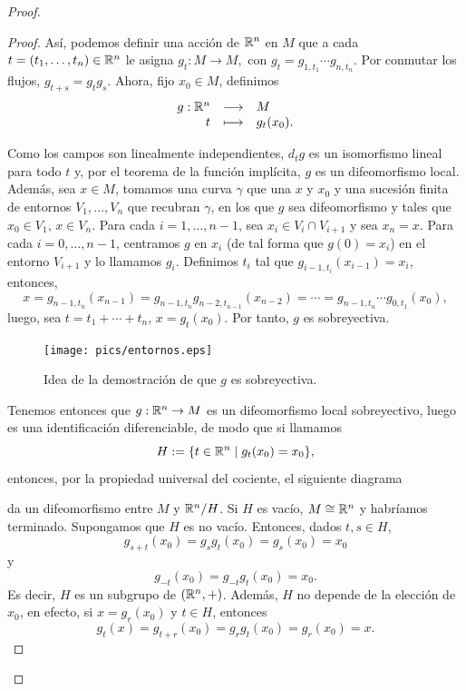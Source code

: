 \begin{proof}
\begin{proof}
  Así, podemos definir una acción de $\mathbb{R}^n$ en $M$ que a cada $t=(t_1,\dots,t_n)\in \mathbb{R}^n$ le asigna $g_t:M\rightarrow M,$ con $g_t=g_{1,t_1}\cdots g_{n,t_n}$.
Por conmutar los flujos, $g_{t+s}=g_t g_s$. Ahora, fijo $x_0 \in M$, definimos 
\[
  \begin{array}{rcl}
g:\mathbb{R}^n & \longrightarrow & M \\
t & \longmapsto & g_t (x_0).
\end{array}
\]

Como los campos son linealmente independientes, $d_t g$ es un isomorfismo lineal para todo $t$ y, por el teorema de la función implícita, $g$ es un difeomorfismo local. Además, sea $x\in M$, tomamos una curva $\gamma$ que una $x$ y $x_0$ y una sucesión finita de entornos $V_1,\dots,V_n$ que recubran $\gamma$, en los que $g$ sea difeomorfismo y tales que $x_0 \in V_1$, $x \in V_n$. Para cada $i=1,\dots,n-1$, sea $x_i \in V_i \cap V_{i+1}$ y sea $x_n=x$. Para cada $i=0,\dots,n-1$, centramos $g$ en $x_i$ (de tal forma que $g(0)=x_i$) en el entorno $V_{i+1}$ y lo llamamos $g_i$. Definimos $t_i$ tal que $g_{i-1,t_i}(x_{i-1})=x_i$, entonces,
\[
  x=g_{n-1,t_n}(x_{n-1})=g_{n-1,t_n}g_{n-2,t_{n-1}}(x_{n-2})=\cdots=g_{n-1,t_{n}}\cdots g_{0,t_1} (x_0),
\]
luego, sea $t=t_1+\cdots+t_n$, $x=g_t (x_0)$. Por tanto, $g$ es sobreyectiva.
\begin{figure}[h]
  \centering
  \texttt{[image: pics/entornos.eps]}
  \caption{Idea de la demostración de que $g$ es sobreyectiva.}
  \label{fig:entornos}
\end{figure}

Tenemos entonces que $g:\mathbb{R}^n\rightarrow M$ es un difeomorfismo local sobreyectivo, luego es una identificación diferenciable, de modo que si llamamos 
\[  
  H:=\{t \in \mathbb{R}^n \mid g_t(x_0)=x_0\},
\]
entonces, por la propiedad universal del cociente, el siguiente diagrama
\begin{center}
\end{center}
da un difeomorfismo entre $M$ y $\mathbb{R}^n/H$. Si $H$ es vacío, $M\cong \mathbb{R}^n$ y habríamos terminado. Supongamos que $H$ es no vacío.
 Entonces, dados $t, s \in H$, 
\[
  g_{s+t}(x_0)=g_sg_t(x_0)=g_s(x_0)=x_0
\]
y 
\[
  g_{-t}(x_0)=g_{-t}g_t(x_0)=x_0.
\] 
Es decir, $H$ es un subgrupo de $(\mathbb{R}^n,+)$. Además, $H$ no depende de la elección de $x_0$, en efecto, si $x=g_r (x_0)$ y $t\in H$, entonces 
\[
  g_t (x) = g_{t+r}(x_0)=g_rg_t(x_0)=g_r(x_0)=x. 
 \] 


\end{proof}
\end{proof}
